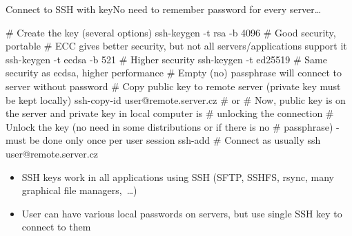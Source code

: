 \documentclass[compress, ucs, xelatex, 11pt, xcolor=svgnames, aspectratio=169,
	hyperref={
		bookmarks=true,
		unicode=true,
		colorlinks=true,
		pdftitle={Linux, command line and MetaCentrum},
		plainpages=false,
		pdfauthor={Vojtech Zeisek},
		pdfsubject={Course about use of Linux command line, writing shell scripts and using MetaCentrum of CESNET},
		pdfcreator={XeLaTeX},
		pdfkeywords={Linux, GNU, BASH, shell, command line, MetaCentrum},
		linkcolor=DarkRed, %
		anchorcolor=DarkBlue, %
		citecolor=Indigo, %
		filecolor=NavyBlue, %
		menucolor=DarkMagenta, %
		urlcolor=DarkBlue, %
		pdftex},
	url={hyphens, lowtilde} %
	]{beamer}
\begin{document}
\begin{frame}[fragile]{Connect to SSH with key}{No need to remember password for every server\ldots}
	\begin{bashcode}
    # Create the key (several options)
    ssh-keygen -t rsa -b 4096 # Good security, portable
    # ECC gives better security, but not all servers/applications support it
    ssh-keygen -t ecdsa -b 521 # Higher security
    ssh-keygen -t ed25519 # Same security as ecdsa, higher performance
    # Empty (no) passphrase will connect to server without password
    # Copy public key to remote server (private key must be kept locally)
    ssh-copy-id user@remote.server.cz # or
    # Now, public key is on the server and private key in local computer is
    # unlocking the connection
    # Unlock the key (no need in some distributions or if there is no
    # passphrase) - must be done only once per user session
    ssh-add
    # Connect as usually
    ssh user@remote.server.cz
	\end{bashcode}
	\vfill
	\begin{itemize}
		\item SSH keys work in all applications using SSH (SFTP, SSHFS, rsync, many graphical file managers,~\ldots)
		\item User can have various local passwords on servers, but use single SSH key to connect to them
	\end{itemize}
\end{frame}
\end{document}
